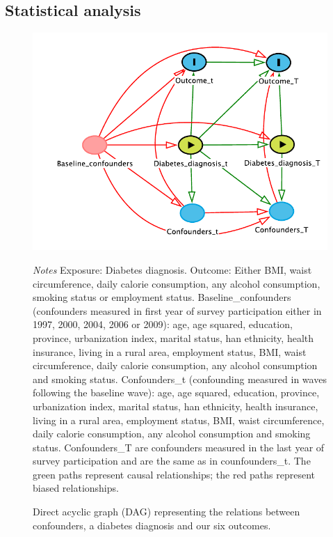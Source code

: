 \subsection*{Statistical analysis}
\begin{figure}
\begin{center}
\caption{\label{fig:DAG} Direct acyclic graph (DAG) representing the relations between confounders, a diabetes diagnosis and our six outcomes.}
\includegraphics[scale=0.5]{Chapter5/Figures/dag_II_alt}
\end{center}
\footnotesize{\textit{Notes} Exposure: Diabetes diagnosis. Outcome: Either BMI, waist circumference, daily calorie consumption, any alcohol consumption, smoking status or employment status. Baseline\_confounders (confounders measured in first year of survey participation either in 1997, 2000, 2004, 2006 or 2009): age, age squared, education, province, urbanization index, marital status, han ethnicity, health insurance, living in a rural area, employment status, BMI, waist circumference, daily calorie consumption, any alcohol consumption and smoking status.
Confounders\_t (confounding measured in waves following the baseline wave): age, age squared, education, province, urbanization index, marital status, han ethnicity, health insurance, living in a rural area, employment status, BMI, waist circumference, daily calorie consumption, any alcohol consumption and smoking status. Confounders\_T are confounders measured in the last year of survey participation and are the same as in counfounders\_t. The green paths represent causal relationships; the red paths represent biased relationships.}

\end{figure}

